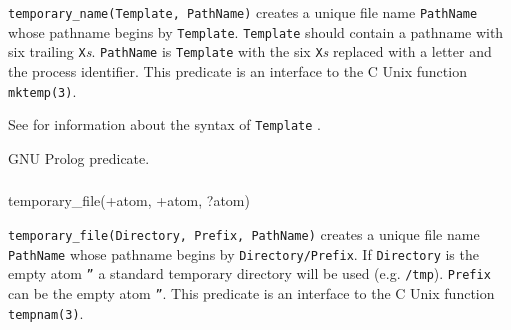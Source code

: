 \Description

\texttt{temporary\_name(Template, PathName)} creates a unique file name
\texttt{PathName} whose pathname begins by \texttt{Template}.
\texttt{Template} should contain a pathname with six trailing
\texttt{X}\emph{s}. \texttt{PathName} is \texttt{Template} with the six
\texttt{X}\emph{s} replaced with a letter and the process identifier. This
predicate is an interface to the C Unix function \texttt{mktemp(3)}.

See  for information about the syntax of
\texttt{Template} .

\begin{PlErrors}






\end{PlErrors}

\Portability

GNU Prolog predicate.

\subsubsection{}

\begin{TemplatesOneCol}
temporary\_file(+atom, +atom, ?atom)

\end{TemplatesOneCol}

\Description

\texttt{temporary\_file(Directory, Prefix, PathName)} creates a unique file
name \texttt{PathName} whose pathname begins by \texttt{Directory/Prefix}.
If \texttt{Directory} is the empty atom \texttt{''} a standard temporary
directory will be used (e.g. \texttt{/tmp}). \texttt{Prefix} can be the
empty atom \texttt{''}. This predicate is an interface to the C Unix
function \texttt{tempnam(3)}.

